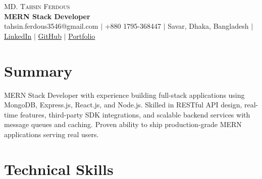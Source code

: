 \documentclass[letterpaper,10.5pt]{article}
\begin{document}

\begin{center}
    {\LARGE \scshape MD. Tahsin Ferdous} \\ \vspace{4pt}
    {\large\bfseries MERN Stack Developer} \\ \vspace{6pt}
    \small
    tahsin.ferdous3546@gmail.com $|$
    +880 1795-368447 $|$
    Savar, Dhaka, Bangladesh $|$
    \href{https://www.linkedin.com/in/md-tahsin-ferdous/}{LinkedIn} $|$
    \href{https://github.com/Tahsin005}{GitHub} $|$
    \href{https://tahsin-exe.vercel.app/}{Portfolio}
\end{center}


\section{Summary}

\small{
MERN Stack Developer with experience building full-stack applications using {MongoDB, Express.js, React.js, and Node.js}. Skilled in RESTful API design, real-time features, third-party SDK integrations, and scalable backend services with message queues and caching. Proven ability to ship production-grade MERN applications serving real users.
}


\section{Technical Skills}
\end{document}
